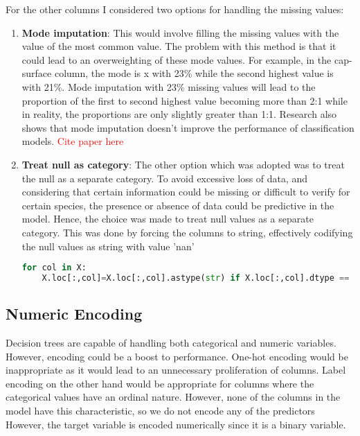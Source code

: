 \documentclass{article}
\begin{document}
For the other columns I considered two options for handling the missing values:
\begin{enumerate}
    \item \textbf{Mode imputation}: This would involve filling the missing values with the value of the most common value. The problem with this method is that it could lead to an overweighting of these mode values. For example, in the cap-surface column, the mode is x with 23\% while the second highest value is  with 21\%. Mode imputation with 23\% missing values will lead to the proportion of the first to second highest value becoming more than 2:1 while in reality, the proportions are only slightly greater than 1:1. Research also shows that mode imputation doesn't improve the performance of classification models. \textcolor{red}{Cite paper here}
    \item \textbf{Treat null as category}: The other option which was adopted was to treat the null as a separate category. To avoid excessive loss of data, and considering that certain information could be missing or difficult to verify for certain species, the presence or absence of data could be predictive in the model. Hence, the choice was made to treat null values as a separate category. This was done by forcing the columns to string, effectively codifying the null values as string with value 'nan'

\begin{lstlisting}[language=Python, caption=Forcing categorical variables to string, label=code:missing_values]
    for col in X:
    X.loc[:,col]=X.loc[:,col].astype(str) if X.loc[:,col].dtype == 'object' else X.loc[:,col]
\end{lstlisting}

\end{enumerate}

\subsection{Numeric Encoding}
Decision trees are capable of handling both categorical and numeric variables. However, encoding could be a boost to performance. One-hot encoding would be inappropriate as it would lead to an unnecessary proliferation of columns. Label encoding on the other hand would be appropriate for columns where the categorical values have an ordinal nature. However, none of the columns in the model have this characteristic, so we do not encode any of the predictors
However, the target variable is encoded numerically since it is a binary variable.
\end{document}
